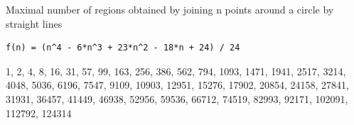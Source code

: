 Maximal number of regions obtained by joining n points around a circle by straight lines
\begin{verbatim}
f(n) = (n^4 - 6*n^3 + 23*n^2 - 18*n + 24) / 24
\end{verbatim}
1, 2, 4, 8, 16, 31, 57, 99, 163, 256, 386, 562, 794, 1093, 1471, 1941, 2517, 3214, 4048, 5036, 6196, 7547, 9109, 10903, 12951, 15276, 17902, 20854, 24158, 27841, 31931, 36457, 41449, 46938, 52956, 59536, 66712, 74519, 82993, 92171, 102091, 112792, 124314
